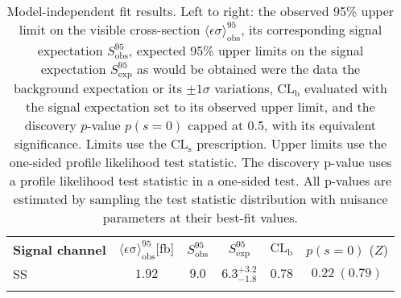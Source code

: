 \begin{table}
\centering
\setlength{\tabcolsep}{0.0pc}
\begin{tabular*}{\textwidth}{@{\extracolsep{\fill}}lccccc}
\noalign{\smallskip}\hline\noalign{\smallskip}
\textbf{Signal channel} &
$\langle\epsilon\mathrm{\sigma}\rangle_\mathrm{obs}^{95}$[fb] &
$S_\mathrm{obs}^{95}$
& $S_\mathrm{exp}^{95}$
& $\mathrm{CL_b}$ &
$p(s=0)$ ($Z$) \\
\noalign{\smallskip}\hline\noalign{\smallskip}
SS & $1.92$ & $9.0$ & $6.3^{+3.2}_{-1.8}$ & $0.78$ & $0.22~(0.79)$ \\
\noalign{\smallskip}\hline\noalign{\smallskip}
\end{tabular*}
\caption{
Model-independent fit results.
Left to right: the observed 95\% upper limit on the visible cross-section
$\langle\epsilon\sigma\rangle_\mathrm{obs}^{95}$,
its corresponding signal expectation $S_\mathrm{obs}^{95}$,
expected 95\% upper limits on the signal expectation $S_\mathrm{exp}^{95}$ as would be obtained
were the data the background expectation or its $\pm 1\sigma$ variations,
$\mathrm{CL_b}$ evaluated with the signal expectation set to its observed upper limit,
and the discovery $p$-value $p(s = 0)$ capped at 0.5,
with its equivalent significance.
Limits use the $\mathrm{CL_s}$ prescription.
Upper limits use the one-sided profile likelihood test statistic.
The discovery p-value uses a profile likelihood test statistic in a one-sided test.
All p-values are estimated by
sampling the test statistic distribution with nuisance parameters at their best-fit values.
}
\label{tab:results.discoxsec.SS}
\end{table}
